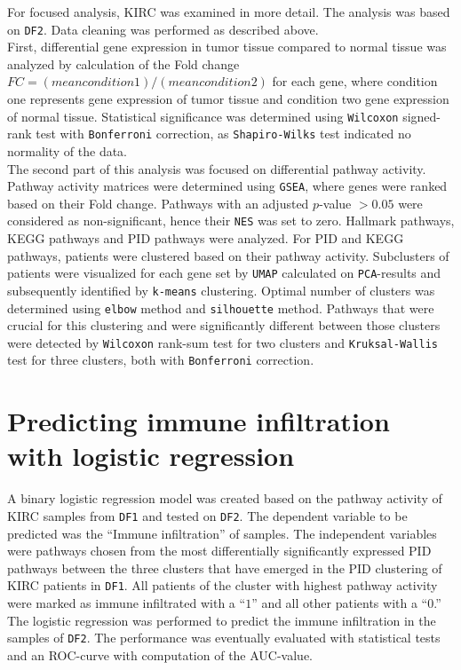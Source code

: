 \documentclass[
  parskip,
  openany]{scrreprt}
\begin{document}
For focused analysis, KIRC was examined in more detail. The analysis was
based on \texttt{DF2}. Data cleaning was performed as described above.\\
First, differential gene expression in tumor tissue compared to normal
tissue was analyzed by calculation of the Fold change
\(FC =(mean condition 1) / (mean condition 2)\) for each gene, where
condition one represents gene expression of tumor tissue and condition
two gene expression of normal tissue. Statistical significance was
determined using \texttt{Wilcoxon} signed-rank test with
\texttt{Bonferroni} correction, as \texttt{Shapiro-Wilks} test indicated
no normality of the data.\\
The second part of this analysis was focused on differential pathway
activity. Pathway activity matrices were determined using \texttt{GSEA},
where genes were ranked based on their Fold change. Pathways with an
adjusted \(p\)-value \(>0.05\) were considered as non-significant, hence
their \texttt{NES} was set to zero. Hallmark pathways, KEGG pathways and
PID pathways were analyzed. For PID and KEGG pathways, patients were
clustered based on their pathway activity. Subclusters of patients were
visualized for each gene set by \texttt{UMAP} calculated on
\texttt{PCA}-results and subsequently identified by \texttt{k-means}
clustering. Optimal number of clusters was determined using
\texttt{elbow} method and \texttt{silhouette} method. Pathways that were
crucial for this clustering and were significantly different between
those clusters were detected by \texttt{Wilcoxon} rank-sum test for two
clusters and \texttt{Kruksal-Wallis} test for three clusters, both with
\texttt{Bonferroni} correction.

\hypertarget{predicting-immune-infiltration-with-logistic-regression}{%
\section{Predicting immune infiltration with logistic
regression}\label{predicting-immune-infiltration-with-logistic-regression}}

A binary logistic regression model was created based on the pathway
activity of KIRC samples from \texttt{DF1} and tested on \texttt{DF2}.
The dependent variable to be predicted was the ``Immune infiltration''
of samples. The independent variables were pathways chosen from the most
differentially significantly expressed PID pathways between the three
clusters that have emerged in the PID clustering of KIRC patients in
\texttt{DF1}. All patients of the cluster with highest pathway activity
were marked as immune infiltrated with a ``\(1\)'' and all other
patients with a ``\(0\).'' The logistic regression was performed to
predict the immune infiltration in the samples of \texttt{DF2}. The
performance was eventually evaluated with statistical tests and an
ROC-curve with computation of the AUC-value.
\end{document}
